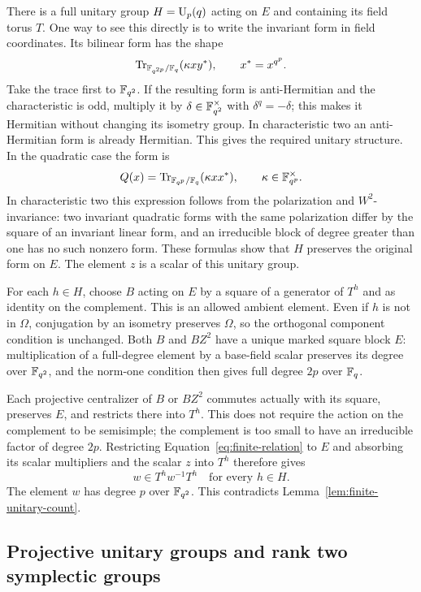 There is a full unitary group $H=\operatorname{U}_p(q)$ acting on $E$ and
containing its field torus $T$. One way to see this directly is to
write the invariant form in field coordinates. Its bilinear form
has the shape
\[
 \operatorname{Tr}_{\mathbb F_{q^{2p}}/\mathbb F_q}(\kappa x y^*),\qquad x^*=x^{q^p}.
\]
Take the trace first to $\mathbb F_{q^2}$. If the resulting form is
anti-Hermitian and the characteristic is odd, multiply it by
$\delta\in\mathbb F_{q^2}^{\times}$ with $\delta^q=-\delta$; this makes
it Hermitian without changing its isometry group. In characteristic
two an anti-Hermitian form is already Hermitian. This gives the
required unitary structure. In the
quadratic case the form is
\[
 Q(x)=\operatorname{Tr}_{\mathbb F_{q^p}/\mathbb F_q}(\kappa xx^*),
 \qquad\kappa\in\mathbb F_{q^p}^\times.
\]
In characteristic two this expression follows from the polarization
and $W^2$-invariance: two invariant quadratic forms with the same
polarization differ by the square of an invariant linear form,
and an irreducible block of degree greater than one has no such
nonzero form. These formulas show that $H$ preserves the original
form on $E$. The element $z$ is a scalar of this unitary group.

For each $h\in H$, choose $B$ acting on $E$ by a square of a
generator of $T^h$ and as identity on the complement. This is an
allowed ambient element. Even if $h$ is not in $\Omega$, conjugation
by an isometry preserves $\Omega$, so the orthogonal component
condition is unchanged. Both $B$ and $BZ^2$ have a unique marked
square block $E$: multiplication of a full-degree element by a
base-field scalar preserves its degree over $\mathbb F_{q^2}$, and the
norm-one condition then gives full degree $2p$ over $\mathbb F_q$.

Each projective centralizer of $B$ or $BZ^2$ commutes actually with
its square, preserves $E$, and restricts there into $T^h$. This
does not require the action on the complement to be semisimple;
the complement is too small to have an irreducible factor of
degree $2p$. Restricting Equation~\eqref{eq:finite-relation} to $E$
and absorbing its scalar multipliers and the scalar $z$ into $T^h$
therefore gives
\[
 w\in T^h w^{-1}T^h\quad\text{for every }h\in H.
\]
The element $w$ has degree $p$ over $\mathbb F_{q^2}$. This contradicts
Lemma~\ref{lem:finite-unitary-count}.

\subsection{Projective unitary groups and rank two symplectic groups}

